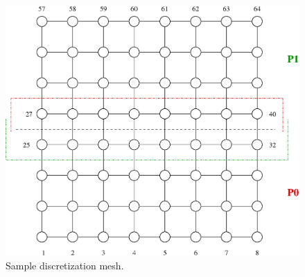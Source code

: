 \begin{figure}[h] 
\begin{center}
\ifcase\pdfoutput
\includegraphics[scale=0.65]{figures/try8x8_ov.eps}
\or
{}
\fi
\end{center}
\caption{Sample discretization mesh.\label{fig:try8x8_ov}}
\end{figure}
